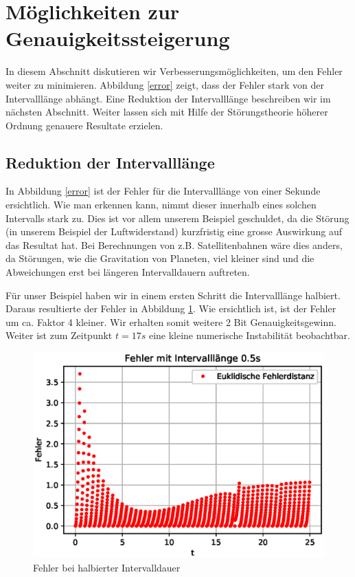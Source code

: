 \section{Möglichkeiten zur Genauigkeitssteigerung
\label{perturbation:section:weitereverbesserungen}}
In diesem Abschnitt diskutieren wir Verbesserungsmöglichkeiten, um den Fehler weiter zu minimieren. 
Abbildung \ref{error} zeigt, dass der Fehler stark von der Intervalllänge abhängt. 
Eine Reduktion der Intervalllänge beschreiben wir im nächsten Abschnitt.
Weiter lassen sich mit Hilfe der Störungstheorie höherer Ordnung genauere Resultate erzielen.

\subsection{Reduktion der Intervalllänge}
In Abbildung \ref{error} ist der Fehler für die Intervalllänge von einer Sekunde ersichtlich. 
Wie man erkennen kann, nimmt dieser innerhalb eines solchen Intervalls stark zu.
Dies ist vor allem unserem Beispiel geschuldet, da die Störung (in unserem Beispiel der Luftwiderstand) kurzfristig eine grosse Auswirkung auf das Resultat hat. 
Bei Berechnungen von z.B. Satellitenbahnen wäre dies anders, da Störungen, wie die Gravitation von Planeten, viel kleiner sind und die Abweichungen erst bei längeren Intervalldauern auftreten.

Für unser Beispiel haben wir in einem ersten Schritt die Intervalllänge halbiert.
Daraus resultierte der Fehler in Abbildung \ref{errorShortInterval}.
Wie ersichtlich ist, ist der Fehler um ca. Faktor 4 kleiner. 
Wir erhalten somit weitere 2 Bit Genauigkeitsgewinn. 
Weiter ist zum Zeitpunkt $t=17s$ eine kleine numerische Instabilität beobachtbar.

\begin{figure}
    \centering
    \includegraphics[scale=0.7]{papers/perturbation/bilder/perturbation_fig4.eps}
    \caption{Fehler bei halbierter Intervalldauer}
	\label{errorShortInterval}
\end{figure}

